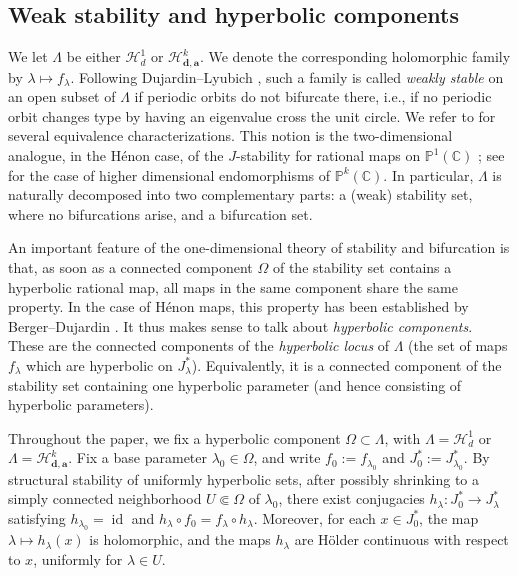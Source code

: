 \documentclass[11pt]{amsart}
\theoremstyle{plain}
\theoremstyle{definition}
\theoremstyle{remark}
\begin{document}
\subsection{Weak stability and hyperbolic components}
We let $\Lambda$ be either  $\mathcal H^1_d$ or $\mathcal H^k_{\mathbf d,\mathbf a}$.
We denote the
corresponding holomorphic family by
$\lambda\mapsto f_\lambda$.
Following Dujardin--Lyubich \cite{DL15}, such a family is called {\it weakly stable} on an open subset of $\Lambda$
if periodic orbits do not bifurcate there, i.e.,
if no
periodic orbit changes type by having an eigenvalue cross the unit circle.
We refer to \cite{DL15} for several equivalence characterizations. 
This
notion is the two-dimensional analogue, in the H\'enon case,
of the $J$-stability for rational maps  on $\mathbb P^1 (\mathbb C)$ \cite{Lyu83typical, MSS83}; see \cite{BBD18}
for the case of higher dimensional endomorphisms
of $\mathbb P^k(\mathbb C)$.
In particular, $\Lambda$ is naturally decomposed into two complementary parts: a 
(weak) stability set, where 
no bifurcations arise, and a bifurcation set.

An important feature of the one-dimensional theory of stability and bifurcation \cite{Lyu83typical,MSS83} is that, as soon as a connected component $\Omega$ of the stability set
contains a hyperbolic rational map, all maps 
in the same component share the same property.
In the case of Hénon maps, this property has been established by
Berger--Dujardin \cite{BergerDujardin2017}.
It thus makes sense to talk about \emph{hyperbolic components}. These are the 
connected components of the 
{\it hyperbolic locus} of $\Lambda$
(the set of maps 
 $f_\lambda$ 
 which are 
 hyperbolic on $J_\lambda^\ast$). Equivalently, it is a connected component of the stability set containing one
hyperbolic parameter
(and hence consisting of hyperbolic parameters).

\medskip

Throughout the paper, we fix 
a hyperbolic component $\Omega\subset\Lambda$, with  $\Lambda=\mathcal H^1_d $ or $\Lambda=\mathcal H^k_{\mathbf d,\mathbf a}$.
Fix a base parameter $\lambda_0\in\Omega$, and write
$f_0:=f_{\lambda_0}$
and
$J_0^\ast:=J_{\lambda_0}^\ast$.
By structural stability of uniformly hyperbolic sets, after possibly shrinking
to a simply connected neighborhood
$U\Subset\Omega$
of $\lambda_0$, there exist conjugacies
$h_\lambda \colon J_0^\ast \to J_\lambda^\ast$ satisfying $h_{\lambda_0}=\operatorname{id}
$ and
$h_\lambda\circ f_0=f_\lambda\circ h_\lambda$.
Moreover, for each $x\in J_0^\ast$, the map
$\lambda\mapsto h_\lambda(x)$
is holomorphic, and the maps $h_\lambda$ are H\"older continuous 
with respect to $x$, uniformly for $\lambda\in U$.
\end{document}
